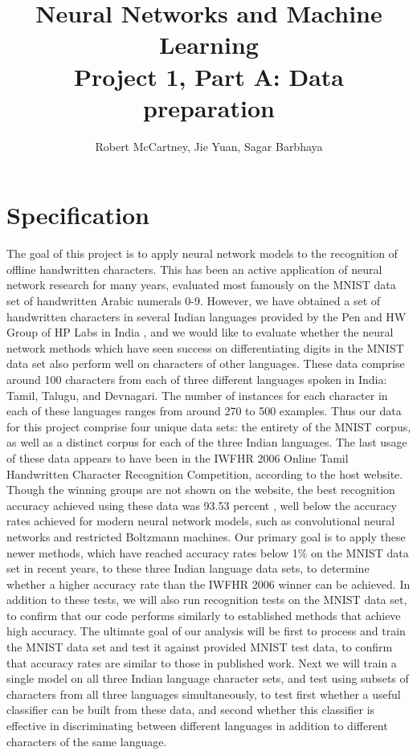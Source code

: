 \documentclass[12pt]{article}  %
\title{Neural Networks and Machine Learning \\ { \large Project 1, Part A: Data preparation}}
\author{
Robert McCartney, Jie Yuan, Sagar Barbhaya
}
\begin{document}
\maketitle

\section{Specification}
\label{Specification}
The goal of this project is to apply neural network models to the recognition of offline handwritten characters. This has been an active application of neural network research for many years, evaluated most famously on the MNIST \cite{website1} data set of handwritten Arabic numerals 0-9. However, we have obtained a set of handwritten characters in several Indian languages provided by the Pen and HW Group of HP Labs in India \cite{website2}, and we would like to evaluate whether the neural network methods which have seen success on differentiating digits in the MNIST data set also perform well on characters of other languages. These data comprise around 100 characters from each of three different languages spoken in India: Tamil, Talugu, and Devnagari. The number of instances for each character in each of these languages ranges from around 270 to 500 examples. Thus our data for this project comprise four unique data sets: the entirety of the MNIST corpus, as well as a distinct corpus for each of the three Indian languages.
The last usage of these data appears to have been in the IWFHR 2006 Online Tamil Handwritten Character Recognition Competition, according to the host website. Though the winning groups are not shown on the website, the best recognition accuracy achieved using these data was 93.53 percent \cite{website3}, well below the accuracy rates achieved for modern neural network models, such as convolutional neural networks and restricted Boltzmann machines. Our primary goal is to apply these newer methods, which have reached accuracy rates below 1\% on the MNIST data set in recent years, to these three Indian language data sets, to determine whether a higher accuracy rate than the IWFHR 2006 winner can be achieved. In addition to these tests, we will also run recognition tests on the MNIST data set, to confirm that our code performs similarly to established methods that achieve high accuracy.
The ultimate goal of our analysis will be first to process and train the MNIST data set and test it against provided MNIST test data, to confirm that accuracy rates are similar to those in published work. Next we will train a single model on all three Indian language character sets, and test using subsets of characters from all three languages simultaneously, to test first whether a useful classifier can be built from these data, and second whether this classifier is effective in discriminating between different languages in addition to different characters of the same language.
\end{document}
